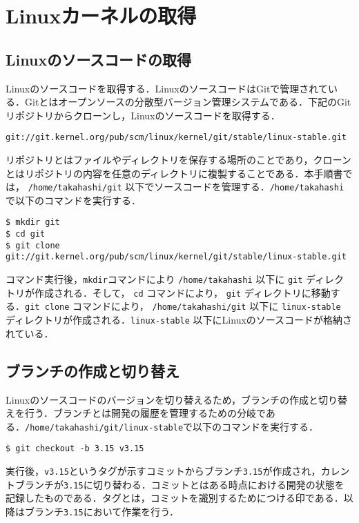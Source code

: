 \documentclass[12pt]{jsarticle}
\begin{document}

\newpage
\section{Linuxカーネルの取得}
\label{sec:getkernel}
\subsection{Linuxのソースコードの取得}
Linuxのソースコードを取得する．LinuxのソースコードはGitで管理されている．Gitとはオープンソースの分散型バージョン管理システムである．下記のGitリポジトリからクローンし，Linuxのソースコードを取得する．

\begin{verbatim}
git://git.kernel.org/pub/scm/linux/kernel/git/stable/linux-stable.git
\end{verbatim}
リポジトリとはファイルやディレクトリを保存する場所のことであり，クローンとはリポジトリの内容を任意のディレクトリに複製することである．本手順書では， \verb|/home/takahashi/git| 以下でソースコードを管理する．\verb|/home/takahashi| で以下のコマンドを実行する．

\begin{verbatim}
$ mkdir git
$ cd git
$ git clone git://git.kernel.org/pub/scm/linux/kernel/git/stable/linux-stable.git
\end{verbatim}
コマンド実行後，\verb|mkdir|コマンドにより \verb|/home/takahashi| 以下に \verb|git| ディレクトリが作成される．そして， \verb|cd| コマンドにより， \verb|git| ディレクトリに移動する．\verb|git clone| コマンドにより， \verb|/home/takahashi/git| 以下に \verb|linux-stable| ディレクトリが作成される．\verb|linux-stable| 以下にLinuxのソースコードが格納されている．

\subsection{ブランチの作成と切り替え}
Linuxのソースコードのバージョンを切り替えるため，ブランチの作成と切り替えを行う．ブランチとは開発の履歴を管理するための分岐である．\verb|/home/takahashi/git/linux-stable|で以下のコマンドを実行する．

\begin{verbatim}
$ git checkout -b 3.15 v3.15
\end{verbatim}
実行後，\verb|v3.15|というタグが示すコミットからブランチ\verb|3.15|が作成され，カレントブランチが\verb|3.15|に切り替わる．コミットとはある時点における開発の状態を記録したものである．タグとは，コミットを識別するためにつける印である．以降はブランチ\verb|3.15|において作業を行う．
\end{document}
